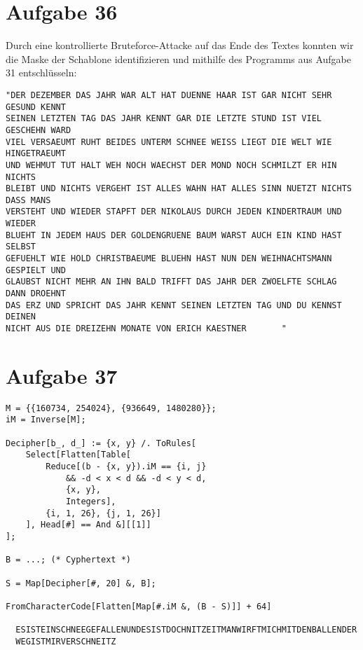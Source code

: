 \section*{Aufgabe 36}
Durch eine kontrollierte Bruteforce-Attacke auf das Ende des Textes konnten wir
die Maske der Schablone identifizieren und mithilfe des Programms aus Aufgabe
31 entschlüsseln:
\begin{verbatim}
"DER DEZEMBER DAS JAHR WAR ALT HAT DUENNE HAAR IST GAR NICHT SEHR GESUND KENNT
SEINEN LETZTEN TAG DAS JAHR KENNT GAR DIE LETZTE STUND IST VIEL GESCHEHN WARD
VIEL VERSAEUMT RUHT BEIDES UNTERM SCHNEE WEISS LIEGT DIE WELT WIE HINGETRAEUMT
UND WEHMUT TUT HALT WEH NOCH WAECHST DER MOND NOCH SCHMILZT ER HIN NICHTS
BLEIBT UND NICHTS VERGEHT IST ALLES WAHN HAT ALLES SINN NUETZT NICHTS DASS MANS
VERSTEHT UND WIEDER STAPFT DER NIKOLAUS DURCH JEDEN KINDERTRAUM UND WIEDER
BLUEHT IN JEDEM HAUS DER GOLDENGRUENE BAUM WARST AUCH EIN KIND HAST SELBST
GEFUEHLT WIE HOLD CHRISTBAEUME BLUEHN HAST NUN DEN WEIHNACHTSMANN GESPIELT UND
GLAUBST NICHT MEHR AN IHN BALD TRIFFT DAS JAHR DER ZWOELFTE SCHLAG DANN DROEHNT
DAS ERZ UND SPRICHT DAS JAHR KENNT SEINEN LETZTEN TAG UND DU KENNST DEINEN
NICHT AUS DIE DREIZEHN MONATE VON ERICH KAESTNER       "
\end{verbatim}

\section*{Aufgabe 37}
\begin{lstlisting}
M = {{160734, 254024}, {936649, 1480280}};
iM = Inverse[M];

Decipher[b_, d_] := {x, y} /. ToRules[
	Select[Flatten[Table[
		Reduce[(b - {x, y}).iM == {i, j}
			&& -d < x < d && -d < y < d,
			{x, y},
			Integers],
		{i, 1, 26}, {j, 1, 26}]
	], Head[#] == And &][[1]]
];

B = ...; (* Cyphertext *)

S = Map[Decipher[#, 20] &, B];

FromCharacterCode[Flatten[Map[#.iM &, (B - S)]] + 64]

  ESISTEINSCHNEEGEFALLENUNDESISTDOCHNITZEITMANWIRFTMICHMITDENBALLENDER
  WEGISTMIRVERSCHNEITZ
\end{lstlisting}

